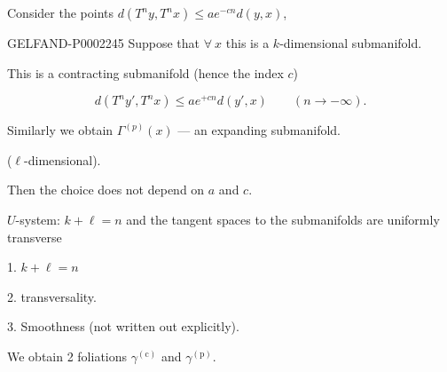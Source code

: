 Consider the points $d (T^n y, T^n x)\leq ae^{-cn}d (y, x)$,



\begin{GelfandAdjacentEvidence}{GELFAND-P000224}{5}
Suppose that $\forall\ x$ this is a $k$-dimensional submanifold.







\end{GelfandAdjacentEvidence}

This is a contracting submanifold (hence the index \underline{\underline{$c$}})



\begin{equation*}
 d (T^n y', T^n x)\leq ae^{+cn}d (y', x)
 \qquad (n\longrightarrow-\infty).
\end{equation*}



Similarly we obtain $\Gamma^{(p)}(x)$ — an expanding submanifold.

($\ell$-dimensional).



Then the choice does not depend on $a$ and $c$.





$U$-system:
$k+\ell=n$ and the tangent spaces to the submanifolds are uniformly transverse



1. $k+\ell=n$

2. transversality.

3. Smoothness (not written out explicitly).



We obtain 2 foliations $\gamma^{(\mathrm{c})}$ and $\gamma^{(\mathrm{p})}$.




